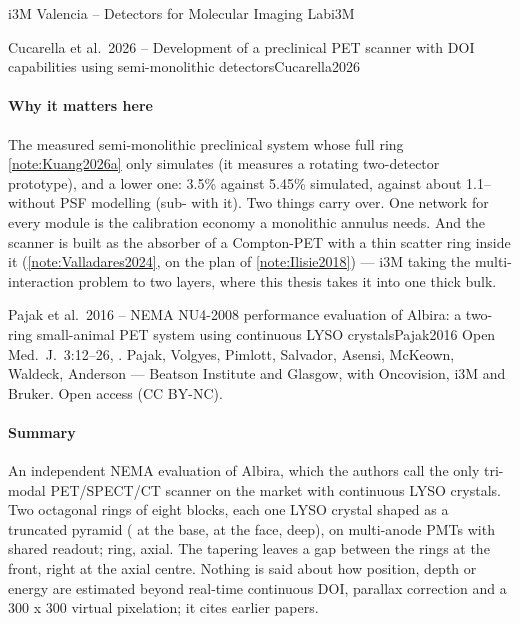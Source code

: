 \begin{programnote}{i3M Valencia -- Detectors for Molecular Imaging Lab}{i3M}
\begin{papernote}{Cucarella et al.\ 2026 -- Development of a preclinical PET scanner with DOI capabilities using semi-monolithic detectors}{Cucarella2026}
\paragraph{Why it matters here}
The measured semi-monolithic preclinical system whose full ring
\ref{note:Kuang2026a} only simulates (it measures a rotating two-detector
prototype), and a lower one: 3.5\% against 5.45\% simulated,  against
about 1.1-- without PSF modelling (sub- with it). Two things carry over. One network for every module is the
calibration economy a monolithic annulus needs. And the scanner is built as the
absorber of a Compton-PET with a thin scatter ring inside it
(\ref{note:Valladares2024}, on the plan of \ref{note:Ilisie2018}) --- i3M
taking the multi-interaction problem to two layers, where this thesis takes it
into one thick bulk.

\end{papernote}

\begin{papernote}{Pajak et al.\ 2016 -- NEMA NU4-2008 performance evaluation of Albira: a two-ring small-animal PET system using continuous LYSO crystals}{Pajak2016}
Open Med.\ J.\ 3:12--26, . Pajak, Volgyes,
Pimlott, Salvador, Asensi, McKeown, Waldeck, Anderson --- Beatson Institute and
Glasgow, with Oncovision, i3M and Bruker. Open access (CC BY-NC).

\paragraph{Summary}
An independent NEMA evaluation of Albira, which the authors call the only
tri-modal PET/SPECT/CT scanner on the market with continuous LYSO
crystals. Two
octagonal rings of eight blocks, each one LYSO crystal shaped as a truncated
pyramid ( at the base,  at
the face,  deep), on multi-anode PMTs with shared readout; 
ring,  axial. The tapering leaves a  gap between the rings
at the front, right at the axial centre. Nothing is said about how position,
depth or energy are estimated beyond real-time continuous DOI, parallax
correction and a 300 x 300 virtual pixelation; it cites earlier papers.


\end{papernote}
\end{programnote}
